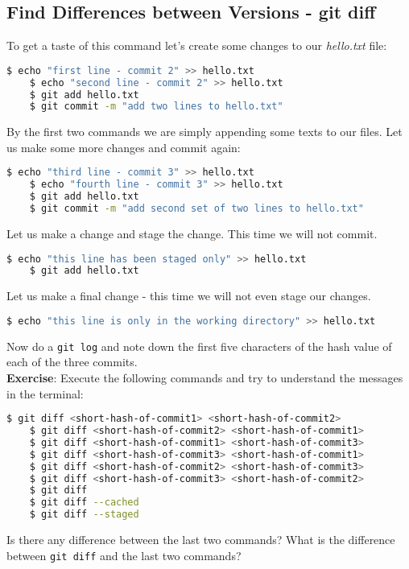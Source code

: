 \documentclass{article}
\begin{document}
\subsection{Find Differences between Versions - git diff}
To get a taste of this command let's create some changes to our \textit{hello.txt} file:
\begin{lstlisting}[language=bash]
	$ echo "first line - commit 2" >> hello.txt
	$ echo "second line - commit 2" >> hello.txt
	$ git add hello.txt
	$ git commit -m "add two lines to hello.txt"
\end{lstlisting}
By the first two commands we are simply appending some texts to our files.
Let us make some more changes and commit again:
\begin{lstlisting}[language=bash]
	$ echo "third line - commit 3" >> hello.txt
	$ echo "fourth line - commit 3" >> hello.txt
	$ git add hello.txt
	$ git commit -m "add second set of two lines to hello.txt"
\end{lstlisting}
Let us make a change and stage the change. This time we will not commit.
\begin{lstlisting}[language=bash]
	$ echo "this line has been staged only" >> hello.txt
	$ git add hello.txt
\end{lstlisting}
Let us make a final change - this time we will not even stage our changes.
\begin{lstlisting}[language=bash]
	$ echo "this line is only in the working directory" >> hello.txt
\end{lstlisting}
Now do a \verb|git log| and note down the first five characters of the hash value of each of the three commits.
\\ \textbf{Exercise}: Execute the following commands and try to understand the messages in the terminal:
\begin{lstlisting}[language=bash]
	$ git diff <short-hash-of-commit1> <short-hash-of-commit2>
	$ git diff <short-hash-of-commit2> <short-hash-of-commit1>
	$ git diff <short-hash-of-commit1> <short-hash-of-commit3>
	$ git diff <short-hash-of-commit3> <short-hash-of-commit1>
	$ git diff <short-hash-of-commit2> <short-hash-of-commit3>
	$ git diff <short-hash-of-commit3> <short-hash-of-commit2>
	$ git diff
	$ git diff --cached
	$ git diff --staged
\end{lstlisting}
Is there any difference between the last two commands? What is the difference between \verb|git diff| and the last two commands?
\end{document}
